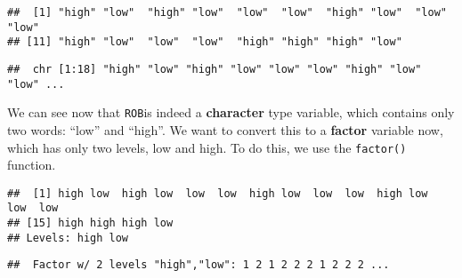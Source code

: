 \documentclass[]{book}
\newenvironment{Shaded}{\begin{snugshade}}{\end{snugshade}}
\newcommand{\KeywordTok}[1]{\textcolor[rgb]{0.13,0.29,0.53}{\textbf{#1}}}
\newcommand{\OperatorTok}[1]{\textcolor[rgb]{0.81,0.36,0.00}{\textbf{#1}}}
\newcommand{\NormalTok}[1]{#1}
\theoremstyle{definition}
\theoremstyle{definition}
\theoremstyle{definition}
\theoremstyle{remark}
\begin{document}
\begin{Shaded}
\end{Shaded}

\begin{verbatim}
##  [1] "high" "low"  "high" "low"  "low"  "low"  "high" "low"  "low"  "low" 
## [11] "high" "low"  "low"  "low"  "high" "high" "high" "low"
\end{verbatim}

\begin{Shaded}
\end{Shaded}

\begin{verbatim}
##  chr [1:18] "high" "low" "high" "low" "low" "low" "high" "low" "low" ...
\end{verbatim}

We can see now that \texttt{ROB}is indeed a \textbf{character} type
variable, which contains only two words: ``low'' and ``high''. We want
to convert this to a \textbf{factor} variable now, which has only two
levels, low and high. To do this, we use the \texttt{factor()} function.

\begin{Shaded}
\end{Shaded}

\begin{verbatim}
##  [1] high low  high low  low  low  high low  low  low  high low  low  low 
## [15] high high high low 
## Levels: high low
\end{verbatim}

\begin{Shaded}
\end{Shaded}

\begin{verbatim}
##  Factor w/ 2 levels "high","low": 1 2 1 2 2 2 1 2 2 2 ...
\end{verbatim}
\end{document}
